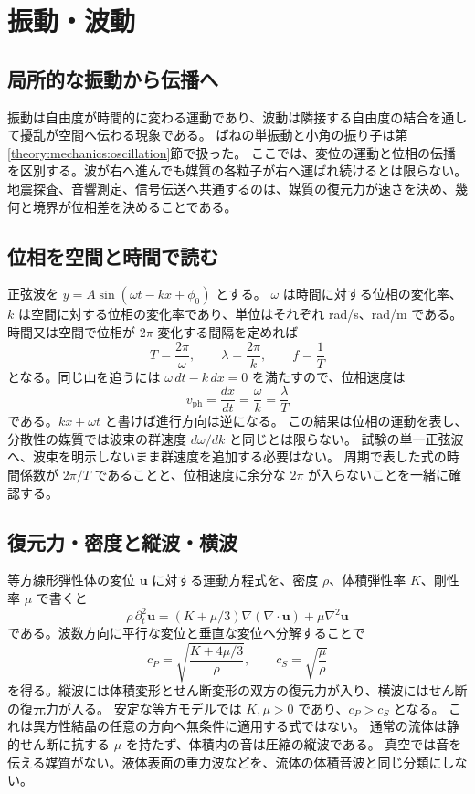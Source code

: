 \chapter{振動・波動}
\section{局所的な振動から伝播へ}
振動は自由度が時間的に変わる運動であり、波動は隣接する自由度の結合を通して擾乱が空間へ伝わる現象である。
ばねの単振動と小角の振り子は第\ref{theory:mechanics:oscillation}節で扱った。
ここでは、変位の運動と位相の伝播を区別する。波が右へ進んでも媒質の各粒子が右へ運ばれ続けるとは限らない。
地震探査、音響測定、信号伝送へ共通するのは、媒質の復元力が速さを決め、幾何と境界が位相差を決めることである。

\section{位相を空間と時間で読む}\label{theory:wave:phase}
正弦波を \(y=A\sin(\omega t-kx+\phi_0)\) とする。
\(\omega\) は時間に対する位相の変化率、\(k\) は空間に対する位相の変化率であり、単位はそれぞれ rad/s、rad/m である。
時間又は空間で位相が \(2\pi\) 変化する間隔を定めれば
\[
 T=\frac{2\pi}{\omega},\qquad \lambda=\frac{2\pi}{k},\qquad f=\frac1T
\]
となる。同じ山を追うには \(\omega\,dt-k\,dx=0\) を満たすので、位相速度は
\[
 v_{\mathrm{ph}}=\frac{dx}{dt}=\frac{\omega}{k}=\frac{\lambda}{T}
\]
である。\(kx+\omega t\) と書けば進行方向は逆になる。
この結果は位相の運動を表し、分散性の媒質では波束の群速度 \(d\omega/dk\) と同じとは限らない。
試験の単一正弦波へ、波束を明示しないまま群速度を追加する必要はない。
周期で表した式の時間係数が \(2\pi/T\) であることと、位相速度に余分な \(2\pi\) が入らないことを一緒に確認する。

\section{復元力・密度と縦波・横波}\label{theory:wave:elastic}
等方線形弾性体の変位 \(\boldsymbol u\) に対する運動方程式を、密度 \(\rho\)、体積弾性率 \(K\)、剛性率 \(\mu\) で書くと
\[
 \rho\,\partial_t^2\boldsymbol u
 =(K+\mu/3)\nabla(\nabla\cdot\boldsymbol u)+\mu\nabla^2\boldsymbol u
\]
である。波数方向に平行な変位と垂直な変位へ分解することで
\[
 c_P=\sqrt{\frac{K+4\mu/3}{\rho}},\qquad
 c_S=\sqrt{\frac{\mu}{\rho}}
\]
を得る。縦波には体積変形とせん断変形の双方の復元力が入り、横波にはせん断の復元力が入る。
安定な等方モデルでは \(K,\mu>0\) であり、\(c_P>c_S\) となる。
これは異方性結晶の任意の方向へ無条件に適用する式ではない。
通常の流体は静的せん断に抗する \(\mu\) を持たず、体積内の音は圧縮の縦波である。
真空では音を伝える媒質がない。液体表面の重力波などを、流体の体積音波と同じ分類にしない。

